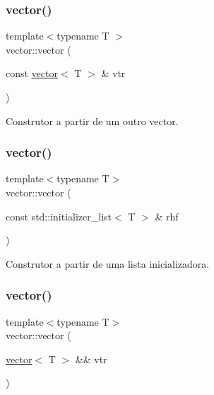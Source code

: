 \subsubsection{\texorpdfstring{vector()}{vector()}\hspace{0.1cm}{\footnotesize\ttfamily [2/5]}}
{\footnotesize\ttfamily template$<$typename T $>$ \\
vector\+::vector (\begin{DoxyParamCaption}\item[{const \hyperlink{classsc_1_1vector}{vector}$<$ T $>$ \&}]{vtr }\end{DoxyParamCaption})}



Construtor a partir de um outro vector. 

\mbox{\label{classsc_1_1vector_a18854e08d7337a72092ff5f41ddf666f}} 
\subsubsection{\texorpdfstring{vector()}{vector()}\hspace{0.1cm}{\footnotesize\ttfamily [3/5]}}
{\footnotesize\ttfamily template$<$typename T$>$ \\
vector\+::vector (\begin{DoxyParamCaption}\item[{const std\+::initializer\+\_\+list$<$ T $>$ \&}]{rhf }\end{DoxyParamCaption})}



Construtor a partir de uma lista inicializadora. 

\mbox{\label{classsc_1_1vector_a63a0f6f3a31120e3e3f269553d0fa82d}} 
\subsubsection{\texorpdfstring{vector()}{vector()}\hspace{0.1cm}{\footnotesize\ttfamily [4/5]}}
{\footnotesize\ttfamily template$<$typename T$>$ \\
vector\+::vector (\begin{DoxyParamCaption}\item[{\hyperlink{classsc_1_1vector}{vector}$<$ T $>$ \&\&}]{vtr }\end{DoxyParamCaption})}




